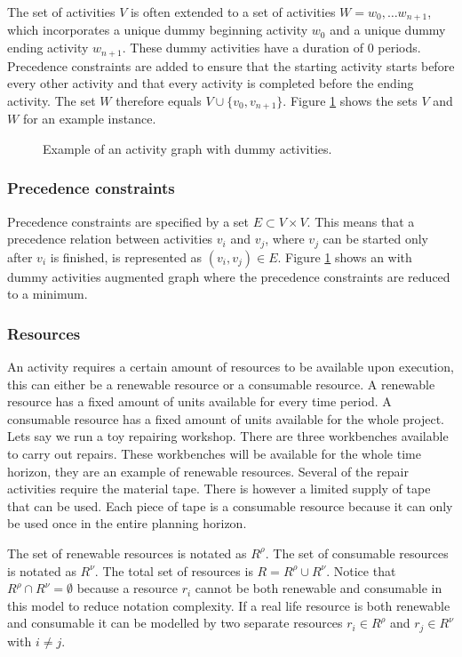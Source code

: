 \documentclass{article}
\newcommand{\renres}[0]{\ensuremath{R^\rho}} %
\newcommand{\conres}[0]{\ensuremath{R^\nu}} %
\newcommand{\res}[0]{\ensuremath{R}} %
\begin{document}
The set of activities $V$ is often extended to a set of activities $W = w_0, \ldots w_{n+1}$, which incorporates a unique dummy beginning activity $w_0$ and a unique dummy ending activity $w_{n+1}$. 
These dummy activities have a duration of $0$ periods. 
Precedence constraints are added to ensure that the starting activity starts before every other activity and that every activity is completed before the ending activity. 
The set $W$ therefore equals $V \cup \{v_0, v_{n+1}\}$. 
Figure \ref{fig:activity_graph} shows the sets $V$ and $W$ for an example instance. 

\begin{figure}[h]
	\centering
	
	\caption{Example of an activity graph with dummy activities. }
	\label{fig:activity_graph}
\end{figure}

\subsubsection{Precedence constraints}
Precedence constraints are specified by a set $E \subset V \times V$.
This means that a precedence relation between activities $v_i$ and $v_j$, where $v_j$ can be started only after $v_i$ is finished, is represented as $(v_i, v_j) \in E$. 
Figure \ref{fig:activity_graph} shows an with dummy activities augmented graph where the precedence constraints are reduced to a minimum. 

\subsubsection{Resources}
An activity requires a certain amount of resources to be available upon execution, this can either be a renewable resource or a consumable resource. 
A renewable resource has a fixed amount of units available for every time period. 
A consumable resource has a fixed amount of units available for the whole project. 
Lets say we run a toy repairing workshop. There are three workbenches available to carry out repairs. 
These workbenches will be available for the whole time horizon, they are an example of renewable resources. 
Several of the repair activities require the material tape. 
There is however a limited supply of tape that can be used. 
Each piece of tape is a consumable resource because it can only be used once in the entire planning horizon. 

The set of renewable resources is notated as \renres. 
The set of consumable resources is notated as \conres. 
The total set of resources is $\res = \renres \cup \conres$. 
Notice that $\renres \cap \conres = \emptyset$ because a resource $r_i$ cannot be both renewable and consumable in this model to reduce notation complexity. 
If a real life resource is both renewable and consumable it can be modelled by two separate resources $r_i \in \renres$ and $r_j \in \conres$ with $i \neq j$. 
\end{document}
